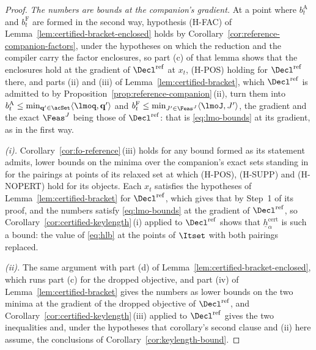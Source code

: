 \begin{proof}
\emph{The numbers are bounds at the companion's gradient.} At a point where
$b^{\mathrm A}_t$ and $b^{\mathrm F}_t$ are formed in the second way,
hypothesis (H-FAC) of Lemma~\ref{lem:certified-bracket-enclosed} holds by
Corollary~\ref{cor:reference-companion-factors}, under the hypotheses on
which the reduction and the compiler carry the factor enclosures, so part
(c) of that lemma shows that the enclosures
hold at the gradient of $\Decl^{\mathrm{ref}}$ at $x_t$, (H-POS) holding for
$\Decl^{\mathrm{ref}}$ there, and parts (ii) and (iii) of
Lemma~\ref{lem:certified-bracket}, which $\Decl^{\mathrm{ref}}$ is admitted
to by Proposition~\ref{prop:reference-companion}\,(ii), turn them into
$b^{\mathrm A}_t\le\min_{\mathbf q'\in\acSet}\langle\lmoq,\mathbf q'\rangle$
and $b^{\mathrm F}_t\le\min_{J'\in\Feas^{J}}\langle\lmoJ,J'\rangle$, the
gradient and the exact $\Feas^{J}$ being those of $\Decl^{\mathrm{ref}}$:
that is \eqref{eq:lmo-bounds} at its gradient, as in the first way.

\emph{(i).} Corollary~\ref{cor:fo-reference}\,(iii) holds for any bound
formed as its statement admits, lower bounds on the minima over the
companion's exact sets standing in for the pairings at points of its relaxed
set at which (H-POS), (H-SUPP) and (H-NOPERT) hold for its objects. Each
$x_t$ satisfies the hypotheses of Lemma~\ref{lem:certified-bracket} for
$\Decl^{\mathrm{ref}}$, which gives that by Step~1 of its proof, and the
numbers satisfy \eqref{eq:lmo-bounds} at the gradient of
$\Decl^{\mathrm{ref}}$, so Corollary~\ref{cor:certified-keylength}\,(i)
applied to $\Decl^{\mathrm{ref}}$ shows that
$\underline{h}^{\mathrm{cert}}_{\alpha}$ is such a bound: the value of
\eqref{eq:hlb} at the points of $\Itset$ with both pairings replaced.

\emph{(ii).} The same argument with part (d) of
Lemma~\ref{lem:certified-bracket-enclosed}, which runs part (c) for the
dropped objective, and part (iv) of Lemma~\ref{lem:certified-bracket} gives
the numbers as lower bounds on the two minima at the gradient of the dropped
objective of $\Decl^{\mathrm{ref}}$, and
Corollary~\ref{cor:certified-keylength}\,(iii) applied to
$\Decl^{\mathrm{ref}}$ gives the two inequalities and, under the hypotheses
that corollary's second clause and (ii) here assume, the conclusions of
Corollary~\ref{cor:keylength-bound}.
\end{proof}

